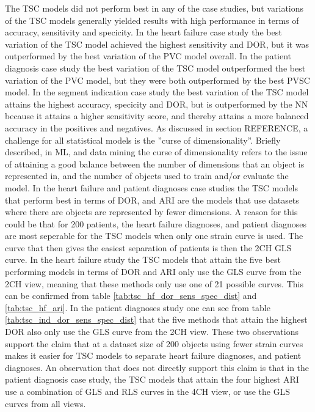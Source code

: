 The TSC models did not perform best in any of the case studies, but variations of the TSC models generally yielded results with high performance in terms of accuracy, sensitivity and specicity.
In the heart failure case study the best variation of the TSC model achieved the highest sensitivity and DOR, but it was outperformed by the best variation of the PVC model overall.
In the patient diagnosis case study the best variation of the TSC model outperformed the best variation of the PVC model, but they were both outperformed by the best PVSC model.
In the segment indication case study the best variation of the TSC model attains the highest accuracy, specicity and DOR, but is outperformed by the NN because it attains a higher sensitivity score, and thereby attains a more balanced accuracy in the positives and negatives.
As discussed in section REFERENCE, a challenge for all statistical models is the ''curse of dimensionality''. Briefly described, in ML, and data mining the curse of dimensionality refers to the issue of attaining a good balance between the number of dimensions that an object is represented in, and the number of objects used to train and/or evaluate the model. 
In the heart failure and patient diagnoses case studies the TSC models that perform best in terms of DOR, and ARI are the models that use datasets where there are objects are represented by fewer dimensions.
A reason for this could be that for 200 patients, the heart failure diagnoses, and patient diagnoses are most seperable for the TSC models when only one strain curve is used. 
The curve that then gives the easiest separation of patients is then the 2CH GLS curve.
In the heart failure study the TSC models that attain the five best performing models in terms of DOR and ARI only use the GLS curve from the 2CH view, meaning that these methods only use one of 21 possible curves. This can be confirmed from table \ref{tab:tsc_hf_dor_sens_spec_dist} and \ref{tab:tsc_hf_ari}.
In the patient diagnoses study one can see from table \ref{tab:tsc_ind_dor_sens_spec_dist} that the five methods that attain the highest DOR also only use the GLS curve from the 2CH view. 
These two observations support the claim that at a dataset size of 200 objects using fewer strain curves makes it easier for TSC models to separate heart failure diagnoses, and patient diagnoses.
An observation that does not directly support this claim is that in the patient diagnosis case study, the TSC models that attain the four highest ARI use a combination of GLS and RLS curves in the 4CH view, or use the GLS curves from all views.
